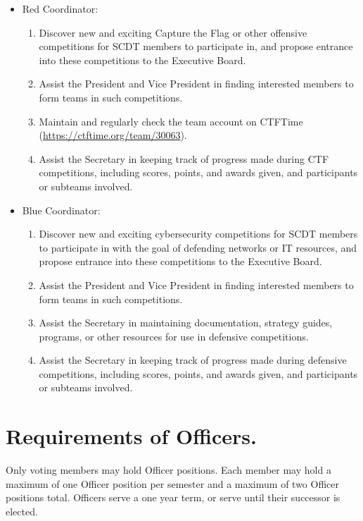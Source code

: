 \documentclass[12pt]{constitution}
\begin{document}
\begin{itemize}
\item Red Coordinator:
  \begin{enumerate}
  \item Discover new and exciting Capture the Flag or other offensive
    competitions for SCDT members to participate in, and propose
    entrance into these competitions to the Executive Board.
  \item Assist the President and Vice President in finding interested
    members to form teams in such competitions.
  \item Maintain and regularly check the team account on CTFTime
    (\url{https://ctftime.org/team/30063}).
  \item Assist the Secretary in keeping track of progress made during
    CTF competitions, including scores, points, and awards given, and
    participants or subteams involved.
  \end{enumerate}

\item Blue Coordinator:
  \begin{enumerate}
  \item Discover new and exciting cybersecurity competitions for SCDT
    members to participate in with the goal of defending networks or IT
    resources, and propose entrance into these competitions to the
    Executive Board.
  \item Assist the President and Vice President in finding interested
    members to form teams in such competitions.
  \item Assist the Secretary in maintaining documentation, strategy
    guides, programs, or other resources for use in defensive
    competitions.
  \item Assist the Secretary in keeping track of progress made during
    defensive competitions, including scores, points, and awards given,
    and participants or subteams involved. 
  \end{enumerate}
\end{itemize}

\section{Requirements of Officers.}\label{sec:REQUIREMENTS-OF-OFFICERS}

Only voting members may hold Officer positions. Each member may hold a maximum
of one Officer position per semester and a maximum of two Officer positions
total. Officers serve a one year term, or serve until their successor is
elected.
\end{document}
